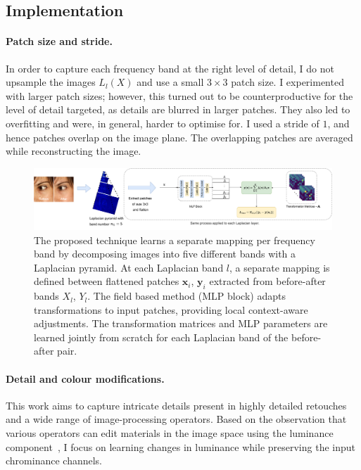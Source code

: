 
\subsection{Implementation}
\label{sec:Implementation}

 \paragraph{Patch size and stride.} In order to capture each frequency band at the right level of detail, I do not upsample the images $L_l(X)$ and use a small $3 \times 3$ patch size. I experimented with larger patch sizes; however, this turned out to be counterproductive for the level of detail targeted, as details are blurred in larger patches. They also led to overfitting and were, in general, harder to optimise for. I used a stride of $1$, and hence patches overlap on the image plane. The overlapping patches are averaged while reconstructing the image.
 
 \begin{landscape}\centering
\vspace*{\fill}
\begin{figure}[htpb]
  \centering
  \includegraphics[width=1.5\textwidth]{Chapters/detail-retouching-figs/MainFig.pdf}
  \caption{The proposed technique learns a separate mapping per frequency band by decomposing images into five different bands with a Laplacian pyramid. At each Laplacian band $l$, a separate mapping is defined between flattened patches $\mathbf{x}_i$, $\mathbf{y}_i$ extracted from before-after bands $X_l$, $Y_l$. The field based method (\gls{MLP} block) adapts transformations to input patches, providing local context-aware adjustments. The transformation matrices and \gls{MLP} parameters are learned jointly from scratch for each Laplacian band of the before-after pair.}
 \label{fig:modelT}

\end{figure}
\vfill
\end{landscape}


\paragraph{Detail and colour modifications.} This work aims to capture intricate details present in highly detailed retouches and a wide range of image-processing operators. Based on the observation that various operators can edit materials in the image space using the luminance component~\cite{Boyadzhiev15Band}, I focus on learning changes in luminance while preserving the input chrominance channels.

